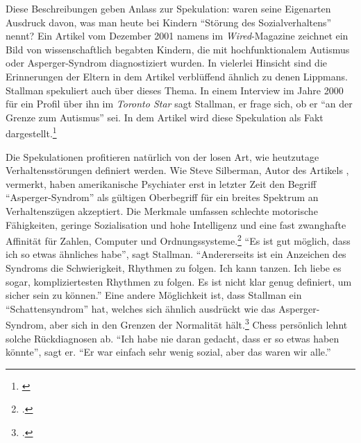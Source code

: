Diese Beschreibungen geben Anlass zur Spekulation:
 waren seine Eigenarten Ausdruck davon, was man heute bei Kindern "`Störung des Sozialverhaltens"' nennt? Ein Artikel vom Dezember 2001 namens  im \textit{Wired}-Magazine zeichnet ein Bild von wissenschaftlich begabten Kindern, die mit hochfunktionalem Autismus oder Asperger-Syndrom diagnostiziert wurden. In vielerlei Hinsicht sind die Erinnerungen der Eltern in dem Artikel verblüffend ähnlich zu denen Lippmans. Stallman spekuliert auch über dieses Thema. In einem Interview im Jahre 2000 für ein Profil über ihn im \textit{Toronto Star} sagt Stallman, er frage sich, ob er "`an der Grenze zum Autismus"' sei. In dem Artikel wird diese Spekulation als Fakt dargestellt.\footnote{\cite[Vgl.][]{frprophet}
}

Die Spekulationen profitieren natürlich von der losen Art, wie heutzutage Verhaltensstörungen definiert werden. Wie Steve Silberman, Autor des Artikels , vermerkt, haben amerikanische Psychiater erst in letzter Zeit den Begriff "`Asperger-Syndrom"' als gültigen Oberbegriff für ein breites Spektrum an Verhaltenszügen akzeptiert. Die Merkmale umfassen schlechte motorische Fähigkeiten, geringe Sozialisation und hohe Intelligenz und eine fast zwanghafte Affinität für Zahlen, Computer und Ordnungssysteme.\footcite[Vgl.][]{geeksyndr}
"`Es ist gut möglich, dass ich so etwas ähnliches habe"', sagt Stallman. "`Andererseits ist ein Anzeichen des Syndroms die Schwierigkeit, Rhythmen zu folgen. Ich kann tanzen. Ich liebe es sogar, kompliziertesten Rhythmen zu folgen. Es ist nicht klar genug definiert, um sicher sein zu können."' Eine andere Möglichkeit ist, dass Stallman ein "`Schattensyndrom"' hat, welches sich ähnlich ausdrückt wie das Asperger-Syndrom, aber sich in den Grenzen der Normalität hält.\footcite[Vgl.][]{shadow}
Chess persönlich lehnt solche Rückdiagnosen ab. "`Ich habe nie daran gedacht, dass er so etwas haben könnte"', sagt er. "`Er war einfach sehr wenig sozial, aber das waren wir alle."'

